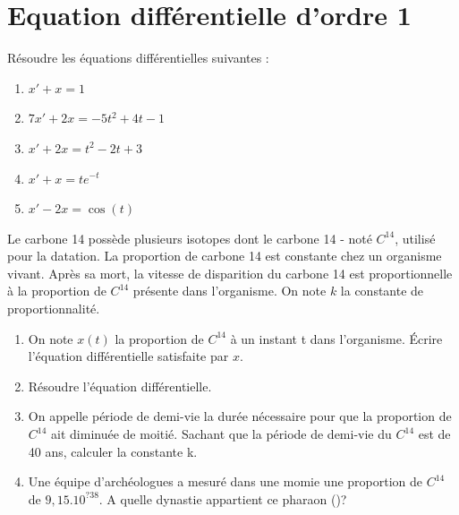 \documentclass{book}
\begin{document}
\section*{Equation différentielle d'ordre 1}
\begin{Exercice}
Résoudre les équations différentielles suivantes :
\begin{enumerate}
\item $x'+x=1$
\item $7x'+2x=-5t^2+4t-1$
\item $x'+2x=t^2-2t+3$
\item $x'+x=te^{-t}$
\item $x'-2x=\cos(t)$
\end{enumerate}
\end{Exercice}
\begin{Exercice}[Datation]
Le carbone 14 possède plusieurs isotopes dont le carbone 14 -
noté $C^{14}$, utilisé pour la datation. La proportion de carbone 14 est constante
chez un organisme vivant. Après sa mort, la vitesse de disparition du carbone 14
est proportionnelle à la proportion de $C^{14}$ présente dans l'organisme. On note
$k$ la constante de proportionnalité.
\begin{enumerate}
\item On note $x(t)$ la proportion de $C^{14}$ à un instant t dans l'organisme. Écrire
l'équation différentielle satisfaite par $x$.
\item Résoudre l'équation différentielle.
\item On appelle période de demi-vie la durée nécessaire pour que la proportion
de $C^{14}$ ait diminuée de moitié. Sachant que la période de demi-vie du $C^{14}$
est de 40 ans, calculer la constante k.
\item Une équipe d'archéologues a mesuré dans une momie une proportion de
$C^{14}$ de $9,15.10^{?38}$. A quelle dynastie appartient ce pharaon ()?
\end{enumerate}
\end{Exercice}
\end{document}
